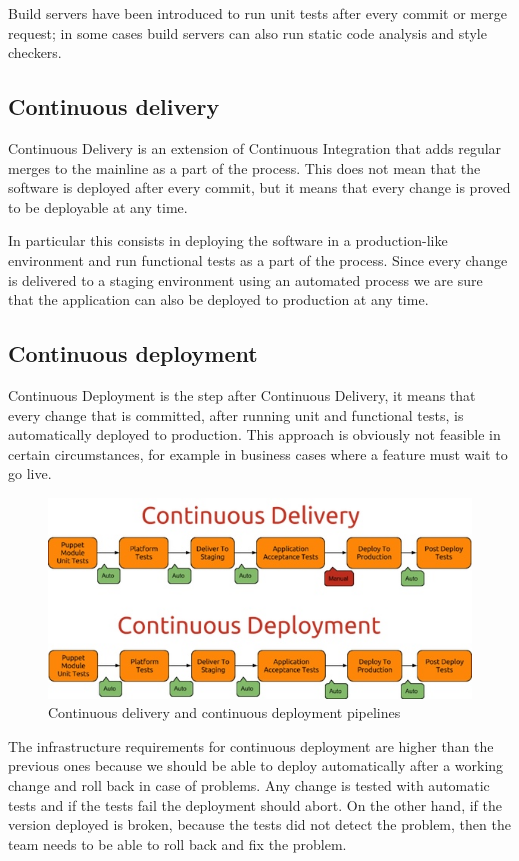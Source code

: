 Build servers have been introduced to run unit tests after every commit or
merge request; in some cases build servers can also run static code
analysis and style checkers.

\subsection{Continuous delivery}

Continuous Delivery is an extension of Continuous Integration that adds regular
merges to the mainline as a part of the process. This does not mean that the
software is deployed after every commit, but it means that every change is
proved to be deployable at any time.

In particular this consists in deploying the software in a production-like
environment and run functional tests as a part of the process. Since every
change is delivered to a staging environment using an automated process we are
sure that the application can also be deployed to production at any time.

\subsection{Continuous deployment}

Continuous Deployment is the step after Continuous Delivery, it means that
every change that is committed, after running unit and functional tests, is
automatically deployed to production. This approach is obviously not feasible
in certain circumstances, for example in business cases where a feature must
wait to go live.

\begin{figure}[H]
\includegraphics[width=\textwidth,height=\textheight,keepaspectratio]{Introduction/Continuous_Delivery_Continuous_Deployment.jpg}
\caption{Continuous delivery and continuous deployment pipelines}
\end{figure}

The infrastructure requirements for continuous deployment are higher than
the previous ones because we should be able to deploy automatically after
a working change and roll back in case of problems. Any change is tested
with automatic tests and if the tests fail the deployment should abort. On
the other hand, if the version deployed is broken, because the tests did
not detect the problem, then the team needs to be able to roll back and
fix the problem.
